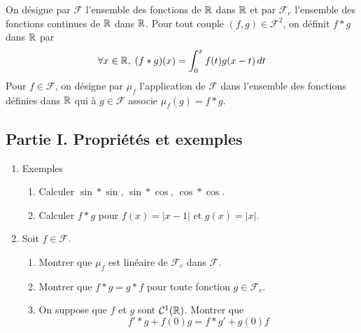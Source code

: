 On désigne par $\mathcal F$ l'ensemble des fonctions de $\mathbb{R}$ dans $\mathbb{R}$ et par $\mathcal F_c$ l'ensemble des fonctions continues de $\mathbb{R}$ dans $\mathbb{R}$. Pour tout couple $(f,g)\in \mathcal F^2$, on définit $f*g$ dans $\mathbb{R}$ par
\begin{displaymath}
 \forall x\in \mathbb{R},\;(f*g)(x) = \int_0^xf(t)g(x-t)\,dt
\end{displaymath}
Pour $f\in \mathcal F$, on désigne par $\mu_f$ l'application de $\mathcal F$ dans l'ensemble des fonctions définies dans $\mathbb{R}$ qui à $g\in\mathcal F$ associe $\mu_f(g) = f*g$.
\subsection*{Partie I. Propriétés et exemples}
\begin{enumerate}
\item Exemples
\begin{enumerate}
 \item Calculer $\sin * \sin$, $\sin*\cos$, $\cos*\cos$.
 \item Calculer $f*g$ pour $f(x)=|x-1|$ et $g(x)=|x|$.
\end{enumerate}

 \item Soit $f\in \mathcal F$.
\begin{enumerate}
 \item Montrer que $\mu_f$ est linéaire de $\mathcal F_c$ dans $\mathcal F$.
 \item Montrer que $f*g=g*f$ pour toute fonction $g\in \mathcal F_c$.
 \item On suppose que $f$ et $g$ sont $\mathcal C^1(\mathbb{R})$. Montrer que
\begin{displaymath}
 f'*g + f(0)g = f*g' + g(0)f 
\end{displaymath}
\end{enumerate}

\end{enumerate}

